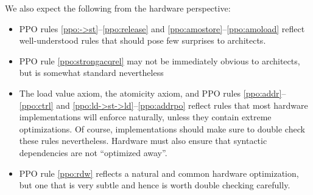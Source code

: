 We also expect the following from the hardware perspective:
\begin{itemize}
  \item PPO rules \ref{ppo:->st}--\ref{ppo:release} and \ref{ppo:amostore}--\ref{ppo:amoload} reflect well-understood rules that should pose few surprises to architects.
  \item PPO rule \ref{ppo:strongacqrel} may not be immediately obvious to architects, but is somewhat standard nevertheless
  \item The load value axiom, the atomicity axiom, and PPO rules \ref{ppo:addr}--\ref{ppo:ctrl} and \ref{ppo:ld->st->ld}--\ref{ppo:addrpo} reflect rules that most hardware implementations will enforce naturally, unless they contain extreme optimizations.  Of course, implementations should make sure to double check these rules nevertheless.  Hardware must also ensure that syntactic dependencies are not ``optimized away''.
  \item PPO rule \ref{ppo:rdw} reflects a natural and common hardware optimization, but one that is very subtle and hence is worth double checking carefully.
\end{itemize}

